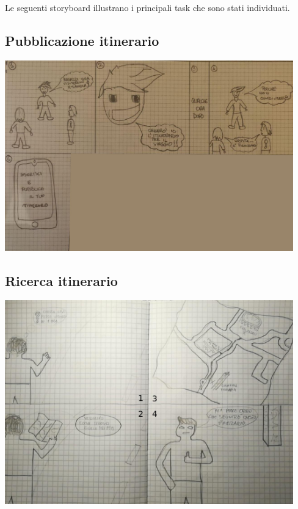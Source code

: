 Le seguenti storyboard illustrano i principali task che sono stati individuati.

\centering \subsection{Pubblicazione itinerario}

\begin{center}
    \includegraphics[width=12.5cm]{../storyboards/Aggiunta.jpg}
\end{center}

\centering \subsection{Ricerca itinerario}

\begin{center}
    \includegraphics[width=12.5cm]{../storyboards/Ricerca.jpg}
\end{center}

